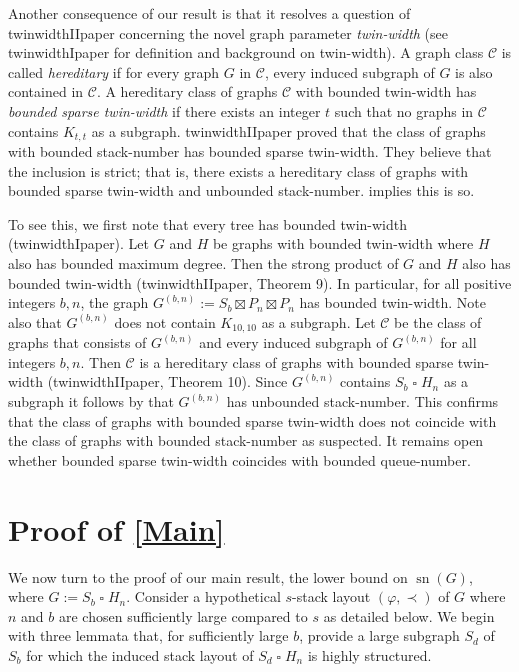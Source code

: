 \documentclass[kpfonts]{patmorin}
\DeclareMathOperator{\sn}{sn}
\newcommand{\CartProd}{\mathbin{\square}}
\begin{document}
Another consequence of our result is that it resolves a question of twinwidthIIpaper concerning the novel graph parameter \emph{twin-width} (see twinwidthIpaper for definition and background on twin-width). A graph class $\mathcal{C}$ is called \textit{hereditary} if for every graph $G$ in $\mathcal{C}$, every induced subgraph of $G$ is also contained in $\mathcal{C}$. A hereditary class of graphs $\mathcal{C}$ with bounded twin-width has \textit{bounded sparse twin-width} if there exists an integer $t$ such that no graphs in $\mathcal{C}$ contains $K_{t,t}$ as a subgraph. twinwidthIIpaper proved that the class of graphs with bounded stack-number has bounded sparse twin-width. They believe that the inclusion is strict; that is, there exists a hereditary class of graphs with bounded sparse twin-width and unbounded stack-number.  implies this is so.

To see this, we first note that every tree has bounded twin-width (twinwidthIpaper). Let $G$ and $H$ be graphs with bounded twin-width where $H$ also has bounded maximum degree. Then the strong product of $G$ and $H$ also has bounded twin-width (twinwidthIIpaper, Theorem 9). In particular, for all positive integers $b,n$, the graph $G^{(b,n)}:= S_b \boxtimes P_n \boxtimes P_n$ has bounded twin-width. Note also that $G^{(b,n)}$ does not contain $K_{10,10}$ as a subgraph. Let $\mathcal{C}$ be the class of graphs that consists of $G^{(b,n)}$ and every induced subgraph of $G^{(b,n)}$ for all integers $b,n$. Then $\mathcal{C}$ is a hereditary class of graphs with bounded sparse twin-width (twinwidthIIpaper, Theorem 10). Since $G^{(b,n)}$ contains $S_b \CartProd H_n$ as a subgraph it follows by  that $G^{(b,n)}$ has unbounded stack-number. This confirms that the class of graphs with bounded sparse twin-width does not coincide with the class of graphs with bounded stack-number as suspected. It remains open whether bounded sparse twin-width coincides with bounded queue-number.




\section{Proof of \cref{Main}}

We now turn to the proof of our main result, the lower bound on $\sn(G)$, where $G:= S_b\CartProd H_n$. Consider a hypothetical $s$-stack layout $(\varphi,\prec)$ of $G$ where $n$ and $b$ are chosen sufficiently large compared to $s$ as detailed below. We begin with three lemmata that, for sufficiently large $b$, provide a large subgraph $S_d$ of $S_b$ for which the induced stack layout of $S_d\CartProd H_n$ is highly structured.
\end{document}
